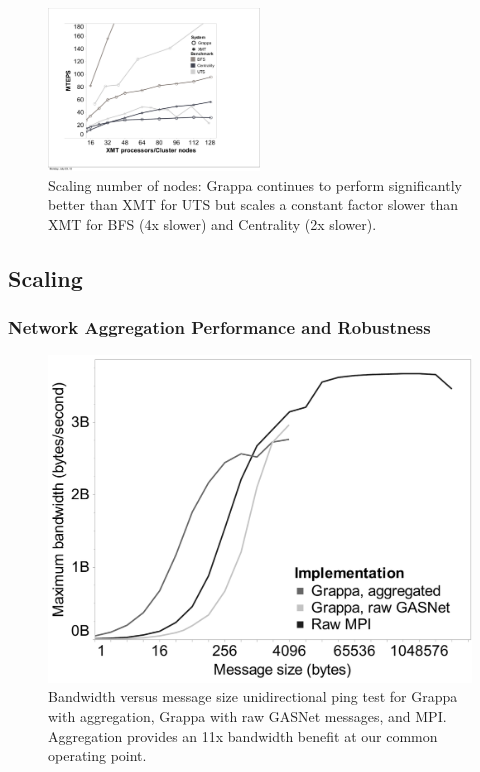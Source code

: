 \begin{figure}[ht]
    \begin{center}
      \includegraphics[width=0.5\textwidth]{figs/scaling_cropped.pdf}
    \end{center}
    \caption{Scaling number of nodes: Grappa continues to perform significantly better than XMT for UTS but scales a constant factor slower than XMT for BFS (4x slower) and Centrality (2x slower). }
    \label{fig:uts_threshold}
\end{figure}

\subsection{Scaling}\label{sec:scaling} 

\subsubsection{Network Aggregation Performance and Robustness}

\begin{figure}[htb]
\begin{center}
  \includegraphics[width=0.95\columnwidth]{figs/aggregator_ping}
\begin{minipage}{0.95\columnwidth}
  \caption{\label{fig:aggregator-ping} Bandwidth versus message size
    unidirectional ping test for Grappa with aggregation, Grappa with
    raw GASNet messages, and MPI. Aggregation provides an 11x
    bandwidth benefit at our common operating point.}
\end{minipage}
\vspace{-3ex}
\end{center}
\end{figure}

